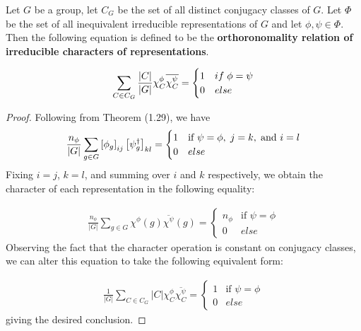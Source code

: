 \begin{theorem}
	Let $G$ be a group, let $C_G$ be the set of all distinct conjugacy classes of $G$. Let $\Phi$ be the set of all inequivalent irreducible representations of $G$ and let $\phi,\psi\in\Phi$. Then the following equation is defined to be the \textbf{orthoronomality relation of irreducible characters of representations}.

$$\sum_{C \in C_G} \frac{|C|}{|G|} \chi^{\phi}_C \overline{\chi^{\psi}_C } = \begin{cases}
																1 & if \hspace{1mm} \phi = \psi \\
																0 & else
															\end{cases}$$
\end{theorem}
\noindent \begin{proof}\cite{Tung}  Following from Theorem (1.29), we have 
$$\frac{n_\phi}{|G|} \sum_{g\in G} \left[\phi_g \right]_{ij} \left[\psi_g^\dag \right]_{kl} = \begin{cases}
																						1 & \text{if } \psi = \phi,\hspace{1mm} j=k,\hspace{1mm} \text{and } i=l\\
																						0 & else
																					 \end{cases}$$
Fixing $i=j$, $k=l$, and summing over $i$ and $k$ respectively, we obtain the character of each representation in the following equality:

\begin{equation}
	\begin{aligned}
		\frac{n_\phi}{|G|} \sum_{g\in G} \chi^\phi(g) \overline{\chi^\psi}(g) = \begin{cases}
																						n_\phi & \text{if } \psi = \phi \\
																						0 & else
																					 \end{cases}
	\end{aligned}
\end{equation}
Observing the fact that the character operation is constant on conjugacy classes, we can alter this equation to take the following equivalent form:

\begin{equation}
	\begin{aligned}
		\frac{1}{|G|} \sum_{C\in C_G} |C| \chi^\phi_C \overline{\chi^\psi_C}= \begin{cases}
																						1 & \text{if } \psi = \phi \\
																						0 & else
																					 \end{cases}
	\end{aligned}
\end{equation}
giving the desired conclusion.  \end{proof}

